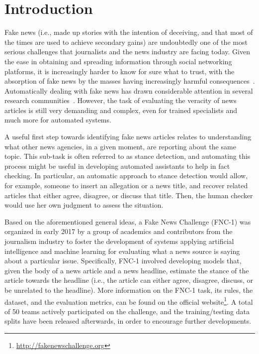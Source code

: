 \section{Introduction}

Fake news (i.e., made up stories with the intention of deceiving, and that most of the times are used to achieve secondary gains) are undoubtedly one of the most serious challenges that journalists and the news industry are facing today. Given the ease in obtaining and spreading information through social networking platforms, it is increasingly harder to know for sure what to trust, with the absorption of fake news by the masses having increasingly harmful consequences~\cite{vosoughi2018spread}. Automatically dealing with fake news has drawn considerable attention in several research communities~\cite{lazer2018science,perez2017automatic,shu2017exploiting,shu2018fakenewsnet,tosikdebunking,DeClarE2018,konstantinovskiy2018towards}. However, the task of evaluating the veracity of news articles is still very demanding and complex, even for trained specialists and much more for automated systems.

A useful first step towards identifying fake news articles relates to understanding
what other news agencies, in a given moment, are reporting about the same topic. This sub-task is often referred to as stance detection, and automating this process might be useful in developing automated assistants to help in fact checking. In particular, an automatic approach to stance detection would allow, for example, someone to insert an allegation or a news title, and recover related articles that either agree, disagree, or discuss that title. Then, the human checker would use her own judgment to assess the situation. 

Based on the aforementioned general ideas, a Fake News Challenge (FNC-1) was organized in early 2017 by a group of academics and contributors from the journalism industry to foster the development of systems applying artificial intelligence and machine learning for evaluating what a news source is saying about a particular issue. Specifically, FNC-1 involved developing models that, given the body of a news article and a news headline, estimate the stance of the article towards the headline (i.e., the article can either agree, disagree, discuss, or be unrelated to the headline). More information on the FNC-1 task, its rules, the dataset, and the evaluation metrics, can be found on the official website\footnote{\scriptsize{\url{http://fakenewschallenge.org}}}. A total of 50 teams actively participated on the challenge, and the training/testing data splits have been released afterwards, in order to encourage further developments. 

